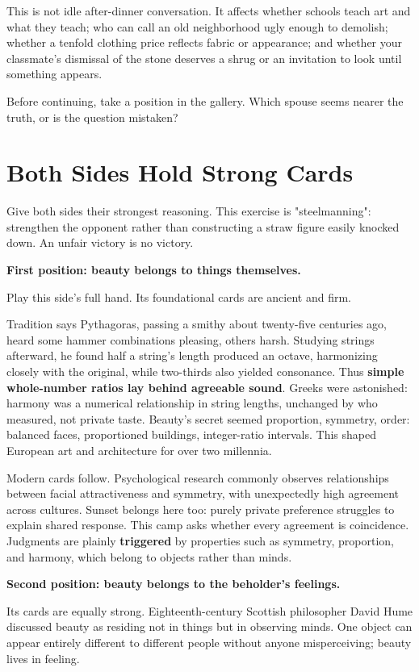 This is not idle after-dinner conversation. It affects whether schools teach art and what they teach; who can call an old neighborhood ugly enough to demolish; whether a tenfold clothing price reflects fabric or appearance; and whether your classmate's dismissal of the stone deserves a shrug or an invitation to look until something appears.

Before continuing, take a position in the gallery. Which spouse seems nearer the truth, or is the question mistaken?

\section{Both Sides Hold Strong Cards}
Give both sides their strongest reasoning. This exercise is "steelmanning": strengthen the opponent rather than constructing a straw figure easily knocked down. An unfair victory is no victory.

\textbf{First position: beauty belongs to things themselves.}

Play this side's full hand. Its foundational cards are ancient and firm.

Tradition says Pythagoras, passing a smithy about twenty-five centuries ago, heard some hammer combinations pleasing, others harsh. Studying strings afterward, he found half a string's length produced an octave, harmonizing closely with the original, while two-thirds also yielded consonance. Thus \textbf{simple whole-number ratios lay behind agreeable sound}. Greeks were astonished: harmony was a numerical relationship in string lengths, unchanged by who measured, not private taste. Beauty's secret seemed proportion, symmetry, order: balanced faces, proportioned buildings, integer-ratio intervals. This shaped European art and architecture for over two millennia.

Modern cards follow. Psychological research commonly observes relationships between facial attractiveness and symmetry, with unexpectedly high agreement across cultures. Sunset belongs here too: purely private preference struggles to explain shared response. This camp asks whether every agreement is coincidence. Judgments are plainly \textbf{triggered} by properties such as symmetry, proportion, and harmony, which belong to objects rather than minds.

\textbf{Second position: beauty belongs to the beholder's feelings.}

Its cards are equally strong. Eighteenth-century Scottish philosopher David Hume discussed beauty as residing not in things but in observing minds. One object can appear entirely different to different people without anyone misperceiving; beauty lives in feeling.

